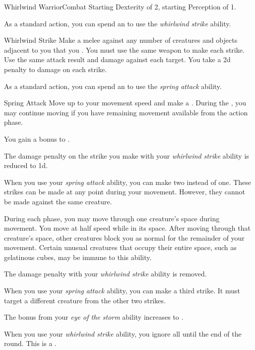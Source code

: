     \begin{feat}{Whirlwind Warrior}{Combat}
        \featpres Starting Dexterity of 2, starting Perception of 1.

         As a standard action, you can spend an  to use the \textit{whirlwind strike} ability.
        \begin{ability}{Whirlwind Strike}
            Make a melee  against any number of creatures and objects adjacent to you that you .
            You must use the same weapon to make each strike.
            Use the same attack result and damage against each target.
            You take a \minus2d penalty to damage on each strike.
        \end{ability}

         As a standard action, you can spend an  to use the \textit{spring attack} ability.
        \begin{ability}{Spring Attack}
            Move up to your movement speed and make a .
            During the , you may continue moving if you have remaining movement available from the action phase.
        \end{ability}

         You gain a  bonus to .

         The damage penalty on the strike you make with your \textit{whirlwind strike} ability is reduced to \minus1d.

         When you use your \textit{spring attack} ability, you can make two  instead of one.
        These strikes can be made at any point during your movement.
        However, they cannot be made against the same creature.

         During each phase, you may move through one creature's space during movement.
        You move at half speed while in its space.
        After moving through that creature's space, other creatures block you as normal for the remainder of your movement.
        Certain unusual creatures that occupy their entire space, such as gelatinous cubes, may be immune to this ability.

         The damage penalty with your \textit{whirlwind strike} ability is removed.

         When you use your \textit{spring attack} ability, you can make a third strike.
        It must target a different creature from the other two strikes.

         The bonus from your \textit{eye of the storm} ability increases to .

         When you use your \textit{whirlwind strike} ability, you ignore all  until the end of the round.
        This is a .
    \end{feat}

